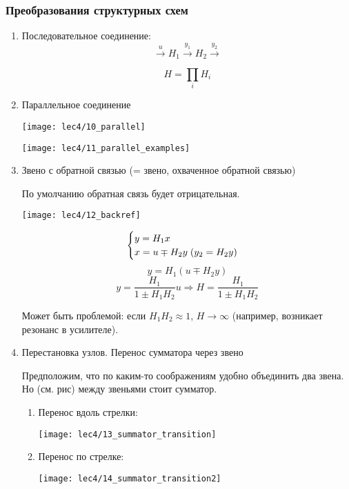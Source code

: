 \documentclass[main.tex]{subfiles}
\begin{document}
\subsubsection{Преобразования структурных схем}

\begin{enumerate}[noitemsep]
    \item Последовательное соединение:
    $$ \xrightarrow{u}\boxed{H_1}\xrightarrow{y_1}\boxed{H_2}\xrightarrow{y_2} $$

    $$ \boxed{H = \prod_i H_i } $$
    \item Параллельное соединение

    \texttt{[image: lec4/10\_parallel]}

    \texttt{[image: lec4/11\_parallel\_examples]}

    \item Звено с обратной связью (= звено, охваченное обратной связью)

    По умолчанию обратная связь будет отрицательная.

    \texttt{[image: lec4/12\_backref]}

    $$ \begin{cases}
        y = H_1x \\
        x = u \mp H_2 y \thickspace (y_2 = H_2y)
    \end{cases} $$
    $$ y = H_1 (u \mp H_2 y) $$
    $$ y = \frac{H_1}{1 \pm H_1 H_2}u \Rightarrow H = \frac{H_1}{1 \pm H_1 H _2} $$

    Может быть проблемой: если $ H_1 H_2 \approx 1 $, $ H \to \infty $ (например, возникает резонанс в усилителе).

    \item Перестановка узлов. Перенос сумматора через звено

    Предположим, что по каким-то соображениям удобно объединить два звена.
    Но (см. рис) между звеньями стоит сумматор.

    \begin{enumerate}[noitemsep]
        \item Перенос вдоль стрелки:

        \texttt{[image: lec4/13\_summator\_transition]}

        \item Перенос по стрелке:

        \texttt{[image: lec4/14\_summator\_transition2]}


\end{enumerate}
\end{enumerate}
\end{document}
